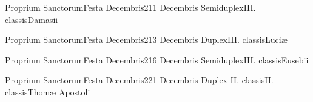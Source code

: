 \documentclass[invitatoriale-romanum.tex]{subfiles}
\begin{document}
	{Proprium Sanctorum}{Festa Decembris}{2}{11 Decembris}
	{Semiduplex}{III. classis}{Damasii}
	{}
	{}

	{Proprium Sanctorum}{Festa Decembris}{2}{13 Decembris}
	{Duplex}{III. classis}{Luciæ}
	{}
	{}

	{Proprium Sanctorum}{Festa Decembris}{2}{16 Decembris}
	{Semiduplex}{III. classis}{Eusebii}
	{}
	{}

	{Proprium Sanctorum}{Festa Decembris}{2}{21 Decembris}
	{Duplex II. classis}{II. classis}{Thomæ Apostoli}
	{}
	{}
\end{document}
